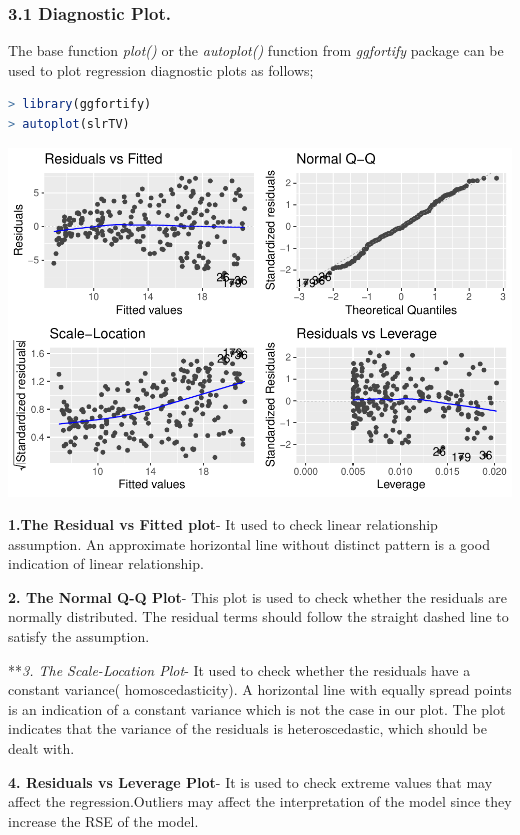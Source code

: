 \documentclass[
]{article}
\begin{document}
\hypertarget{diagnostic-plot.}{%
\subsubsection{3.1 Diagnostic Plot.}\label{diagnostic-plot.}}

The base function \emph{plot()} or the \emph{autoplot()} function from
\emph{ggfortify} package can be used to plot regression diagnostic plots
as follows;

\begin{lstlisting}[language=R]
> library(ggfortify)
> autoplot(slrTV)
\end{lstlisting}

\includegraphics{Types-of-Regressions_files/figure-latex/unnamed-chunk-16-1.pdf}

\textbf{1.The Residual vs Fitted plot}- It used to check linear
relationship assumption. An approximate horizontal line without distinct
pattern is a good indication of linear relationship.

\textbf{2. The Normal Q-Q Plot}- This plot is used to check whether the
residuals are normally distributed. The residual terms should follow the
straight dashed line to satisfy the assumption.

**\emph{3. The Scale-Location Plot}- It used to check whether the
residuals have a constant variance( homoscedasticity). A horizontal line
with equally spread points is an indication of a constant variance which
is not the case in our plot. The plot indicates that the variance of the
residuals is heteroscedastic, which should be dealt with.

\textbf{4. Residuals vs Leverage Plot}- It is used to check extreme
values that may affect the regression.Outliers may affect the
interpretation of the model since they increase the RSE of the model.
\end{document}

